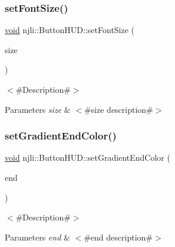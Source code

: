 \subsubsection{\texorpdfstring{set\+Font\+Size()}{setFontSize()}}
{\footnotesize\ttfamily \mbox{\hyperlink{_thread_8h_af1e856da2e658414cb2456cb6f7ebc66}{void}} njli\+::\+Button\+H\+U\+D\+::set\+Font\+Size (\begin{DoxyParamCaption}\item[{\mbox{\hyperlink{_util_8h_a5f6906312a689f27d70e9d086649d3fd}{f32}}}]{size }\end{DoxyParamCaption})}

$<$\#\+Description\#$>$


\begin{DoxyParams}{Parameters}
{\em size} & $<$\#size description\#$>$ \\
\hline
\end{DoxyParams}
\mbox{\label{classnjli_1_1_button_h_u_d_a6b842db44f87687d59ba28d1a090da61}} 
\subsubsection{\texorpdfstring{set\+Gradient\+End\+Color()}{setGradientEndColor()}}
{\footnotesize\ttfamily \mbox{\hyperlink{_thread_8h_af1e856da2e658414cb2456cb6f7ebc66}{void}} njli\+::\+Button\+H\+U\+D\+::set\+Gradient\+End\+Color (\begin{DoxyParamCaption}\item[{const bt\+Vector4 \&}]{end }\end{DoxyParamCaption})}

$<$\#\+Description\#$>$


\begin{DoxyParams}{Parameters}
{\em end} & $<$\#end description\#$>$ \\
\hline
\end{DoxyParams}
\mbox{\label{classnjli_1_1_button_h_u_d_ab2cca8ad90957d9d2baf24ce1d844d5e}} 
